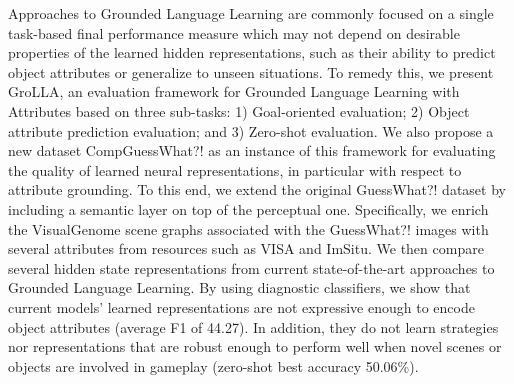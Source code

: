 Approaches to Grounded Language Learning are commonly focused on a single task-based final performance measure which may not depend on desirable properties of the learned hidden representations, such as their ability to predict object attributes or generalize to unseen situations. To remedy this, we present GroLLA, an evaluation framework for Grounded Language Learning with Attributes based on three sub-tasks: 1) Goal-oriented evaluation; 2) Object attribute prediction evaluation; and 3) Zero-shot evaluation. We also propose a new dataset CompGuessWhat?! as an instance of this framework for evaluating the quality of learned neural representations, in particular with respect to attribute grounding. To this end, we extend the original GuessWhat?! dataset by including a semantic layer on top of the perceptual one. Specifically, we enrich the VisualGenome scene graphs associated with the GuessWhat?! images with several attributes from resources such as VISA  and ImSitu. We then compare several hidden state representations from current state-of-the-art approaches to Grounded Language Learning. By using diagnostic classifiers, we show that current models' learned representations are not expressive enough to encode object attributes (average F1 of 44.27). In addition, they do not learn strategies nor representations that are robust enough to perform well when novel scenes or objects are involved in gameplay (zero-shot best accuracy 50.06\%).

